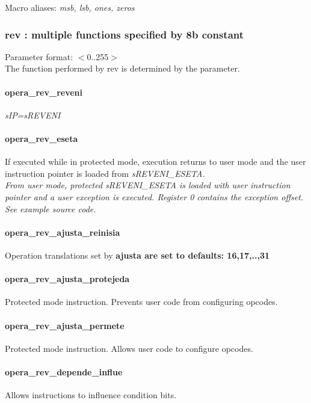 \documentclass[a4paper,11pt]{article}
\begin{document}
 Macro aliases: \sl msb, lsb, ones, zeros \rm\\

\subsubsection{rev : multiple functions specified by 8b constant} 
 Parameter format: $<$0..255$>$\\
 The function performed by rev is determined by the parameter.
 
\paragraph{opera\_rev\_reveni}
  \sl sIP=sREVENI \rm
 
\paragraph{opera\_rev\_eseta}
  If executed while in protected mode, execution returns to user mode and the user instruction pointer is loaded from \sl sREVENI\_ESETA\rm.\\
  From user mode, protected \sl sREVENI\_ESETA \rm is loaded with user instruction pointer and a user exception is executed. Register 0 contains the exception offset. See example source code.
 
\paragraph{opera\_rev\_ajusta\_reinisia}
  Operation translations set by \bf ajusta \rm are set to defaults: 16,17,..,31\\
  
\paragraph{opera\_rev\_ajusta\_protejeda}
  Protected mode instruction. Prevents user code from configuring opcodes.
 
\paragraph{opera\_rev\_ajusta\_permete}
  Protected mode instruction. Allows user code to configure opcodes.
  
\paragraph{opera\_rev\_depende\_influe}
  Allows instructions to influence condition bits.
  
\end{document}
